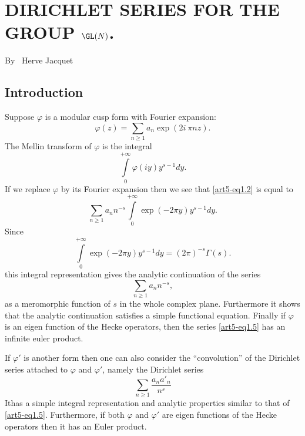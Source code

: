 \chapter{DIRICHLET SERIES FOR THE GROUP $\GL(N)$.}\label{art-5}

\begin{center}
{\large By~ Herve Jacquet}
\end{center}

\bigskip

\setcounter{pageoriginal}{154}
\section{Introduction}\label{art5-sec1}
\pageoriginale
Suppose $\varphi$ is a modular cusp form with Fourier expansion:
\begin{equation*}
\varphi(z)=\sum\limits_{n\geq 1}a_{n}\exp(2i\ \pi n z).\tag{1.1}\label{art5-eq1.1}
\end{equation*}
The Mellin transform of $\varphi$ is the integral
\begin{equation*}
\int\limits^{+\infty}_{0}\varphi(iy)y^{s-1}dy.\tag{1.2}\label{art5-eq1.2}
\end{equation*}
If we replace $\varphi$ by its Fourier expansion then we see that \eqref{art5-eq1.2} is equal to
\begin{equation*}
\sum\limits_{n\geq 1}a_{n}n^{-s}\int\limits^{+\infty}_{0}\exp (-2\pi y)y^{s-1}dy.\tag{1.3}\label{art5-eq1.3}
\end{equation*}
Since
\begin{equation*}
\int\limits_{0}^{+\infty}\exp(-2\pi y)y^{s-1}dy=(2\pi)^{-s}\Gamma(s).\tag{1.4}\label{art5-eq1.4}
\end{equation*}
this integral representation gives the analytic continuation of the series
\begin{equation*}
\sum\limits_{n\geq 1} a_{n}n^{-s},\tag{1.5}\label{art5-eq1.5}
\end{equation*}
as a meromorphic function of $s$ in the whole complex plane. Furthermore it shows that the analytic continuation satisfies a simple functional equation. Finally if $\varphi$ is an eigen function of the Hecke operators, then the series \eqref{art5-eq1.5} has an infinite euler product.

If $\varphi'$ is another form then one can also consider the ``convolution'' of the Dirichlet series attached to $\varphi$ and $\varphi'$, namely the Dirichlet series
\begin{equation*}
\sum\limits_{n\geq 1} \frac{a_{n}a'_{n}}{n^{s}}\tag{1.6}\label{art5-eq1.6}
\end{equation*}
It\pageoriginale has a simple integral representation and analytic properties similar to that of \eqref{art5-eq1.5}. Furthermore, if both $\varphi$ and $\varphi'$ are eigen functions of the Hecke operators then it has an Euler product.

